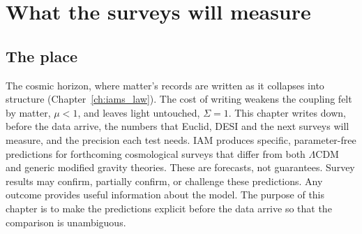 \chapter{What the surveys will measure}\label{ch:surveys}

\section*{The place}
The cosmic horizon, where matter's records are written as it collapses into structure (Chapter~\ref{ch:iams_law}). The cost of writing weakens the
coupling felt by matter, $\mu<1$, and leaves light untouched, $\Sigma=1$. This chapter writes down, before the data arrive, the numbers that Euclid,
DESI and the next surveys will measure, and the precision each test needs. IAM produces specific, parameter-free predictions for forthcoming
cosmological surveys that differ from both $\Lambda$CDM and generic modified gravity theories. These are forecasts, not guarantees. Survey
results may confirm, partially confirm, or challenge these predictions. Any outcome provides useful information about the model. The purpose of
this chapter is to make the predictions explicit before the data arrive so that the comparison is unambiguous.

